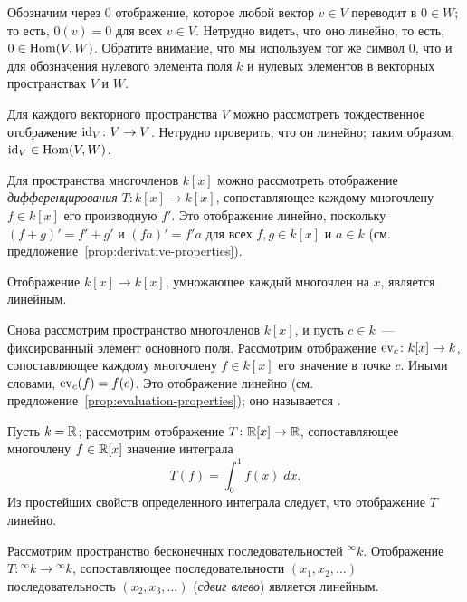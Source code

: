 \begin{example}
Обозначим через $0$ отображение, которое любой вектор $v\in V$
переводит в $0\in W$; то есть, $0(v)=0$ для всех $v\in V$.
Нетрудно видеть, что оно линейно, то есть,
$0\in\operatorname{Hom}(V,W)$. Обратите внимание, что мы используем тот же
символ $0$, что и для обозначения нулевого элемента поля $k$
и нулевых элементов в векторных пространствах $V$ и $W$.
\end{example}
\begin{example}
Для каждого векторного пространства $V$ можно рассмотреть
тождественное отображение $\operatorname{id}_V\colon V\to V$.
Нетрудно проверить, что он линейно; таким образом,
$\operatorname{id}_V\in\operatorname{Hom}(V,W)$.
\end{example}
\begin{example}\label{example:linear-derivative}
Для пространства многочленов $k[x]$ можно рассмотреть отображение
{\em дифференцирования} $T\colon k[x]\to k[x]$, сопоставляющее каждому
многочлену $f\in k[x]$ его производную $f'$. Это отображение линейно,
поскольку $(f+g)' = f' + g'$ и $(fa)' = f'a$ для всех
$f,g\in k[x]$ и $a\in k$ (см.
предложение~\ref{prop:derivative-properties}).
\end{example}
\begin{example}\label{example:linear-timesx}
Отображение $k[x]\to k[x]$, умножающее каждый многочлен на $x$,
является линейным.
\end{example}
\begin{example}
Снова рассмотрим пространство многочленов $k[x]$, и пусть
$c\in k$~--- фиксированный элемент основного поля.
Рассмотрим отображение $\operatorname{ev}_c\colon k[x]\to k$, сопоставляющее
каждому многочлену $f\in k[x]$ его значение в точке $c$.
Иными словами, $\operatorname{ev}_c(f) = f(c)$.
Это отображение линейно (см. предложение~\ref{prop:evaluation-properties});
оно называется .
\end{example}
\begin{example}
Пусть $k=\mathbb R$; рассмотрим отображение $T\colon \mathbb R[x]\to\mathbb R$,
сопоставляющее многочлену $f\in\mathbb R[x]$ значение интеграла
$$
T(f) = \int_0^1 f(x)\;dx.
$$
Из простейших свойств определенного интеграла следует, что
отображение $T$ линейно.
\end{example}
\begin{example}
Рассмотрим пространство бесконечных последовательностей ${}^\infty k$.
Отображение $T\colon {}^\infty k\to {}^\infty k$, сопоставляющее
последовательности $(x_1,x_2,\dots)$ последовательность
$(x_2,x_3,\dots)$ ({\em сдвиг влево}) является линейным.
\end{example}


